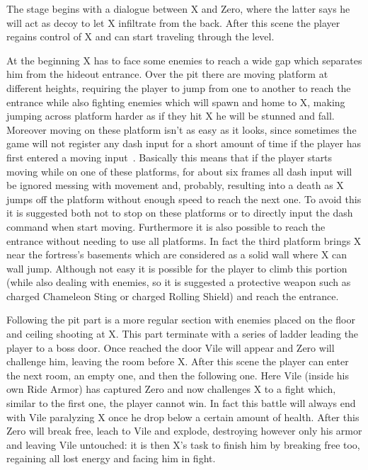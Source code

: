 The stage begins with a dialogue between X and Zero, where the latter says he will act as decoy to let X infiltrate from the back. After this scene the player regains control of X and can start traveling through the level. 

At the beginning X has to face some enemies to reach a wide gap which separates him from the hideout entrance. Over the pit there are moving platform at different heights, requiring the player to jump from one to another to reach the entrance while also fighting enemies which will spawn and home to X, making jumping across platform harder as if they hit X he will be stunned and fall. Moreover moving on these platform isn't as easy as it looks, since sometimes the game will not register any dash input for a short amount of time if the player has first entered a moving input~\cite{RTA_wiki:X1}. Basically this means that if the player starts moving while on one of these platforms, for about six frames all dash input will be ignored messing with movement and, probably, resulting into a death as X jumps off the platform without enough speed to reach the next one. To avoid this it is suggested both not to stop on these platforms or to directly input the dash command when start moving. Furthermore it is also possible to reach the entrance without needing to use all platforms. In fact the third platform brings X near the fortress's basements which are considered as a solid wall where X can wall jump. Although not easy it is possible for the player to climb this portion (while also dealing with enemies, so it is suggested a protective weapon such as charged Chameleon Sting or charged Rolling Shield) and reach the entrance.

Following the pit part is a more regular section with enemies placed on the floor and ceiling shooting at X. This part terminate with a series of ladder leading the player to a boss door. Once reached the door Vile will appear and Zero will challenge him, leaving the room before X. After this scene the player can enter the next room, an empty one, and then the following one. Here Vile (inside his own Ride Armor) has captured Zero and now challenges X to a fight which, similar to the first one, the player cannot win. In fact this battle will always end with Vile paralyzing X once he drop below a certain amount of health. After this Zero will break free, leach to Vile and explode, destroying however only his armor and leaving Vile untouched: it is then X's task to finish him by breaking free too, regaining all lost energy and facing him in fight.

